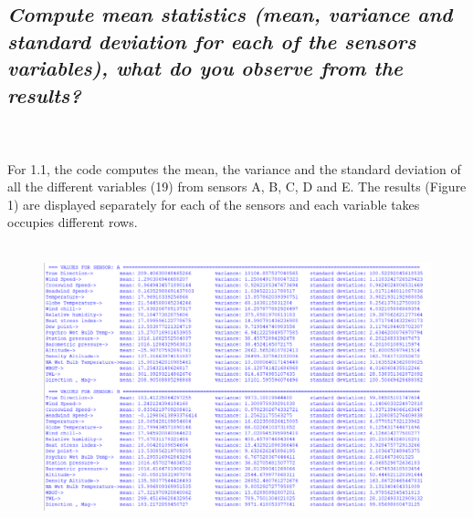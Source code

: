 \documentclass[a4paper,12pt]{article} %
\begin{document}
\subsection{\it Compute mean statistics (mean, variance and standard deviation for each of the sensors variables), what do you observe from the results?} %
\\\\
For 1.1, the code computes the mean, 
the variance and the standard deviation of 
all the different variables (19) from sensors A, B, C, D and E. 
The results (Figure 1) are displayed separately for each of the sensors and each variable takes occupies different rows.
\\\\
\begin{figure}[H]
    \centering
    \includegraphics[width=\textwidth]{Graphs/Statistcal Indicators AB.PNG}
\end{figure}
\end{document}
